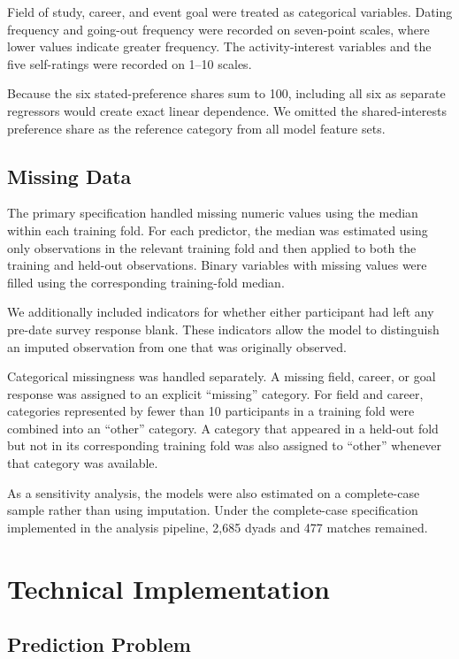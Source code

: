 \documentclass[11pt,letterpaper,reqno]{amsart}
\numberwithin{equation}{subsection}
\theoremstyle{definition}
\numberwithin{thm}{subsection}
\begin{document}
Field of study, career, and event goal were treated as categorical variables. Dating frequency and going-out frequency were recorded on seven-point scales, where lower values indicate greater frequency. The activity-interest variables and the five self-ratings were recorded on 1--10 scales.

Because the six stated-preference shares sum to 100, including all six as separate regressors would create exact linear dependence. We omitted the shared-interests preference share as the reference category from all model feature sets.

\subsection{Missing Data}

The primary specification handled missing numeric values using the median within each training fold. For each predictor, the median was estimated using only observations in the relevant training fold and then applied to both the training and held-out observations. Binary variables with missing values were filled using the corresponding training-fold median.

We additionally included indicators for whether either participant had left any pre-date survey response blank. These indicators allow the model to distinguish an imputed observation from one that was originally observed.

Categorical missingness was handled separately. A missing field, career, or goal response was assigned to an explicit ``missing'' category. For field and career, categories represented by fewer than 10 participants in a training fold were combined into an ``other'' category. A category that appeared in a held-out fold but not in its corresponding training fold was also assigned to ``other'' whenever that category was available.

As a sensitivity analysis, the models were also estimated on a complete-case sample rather than using imputation. Under the complete-case specification implemented in the analysis pipeline, 2,685 dyads and 477 matches remained.

\section{Technical Implementation}

\subsection{Prediction Problem}
\end{document}
